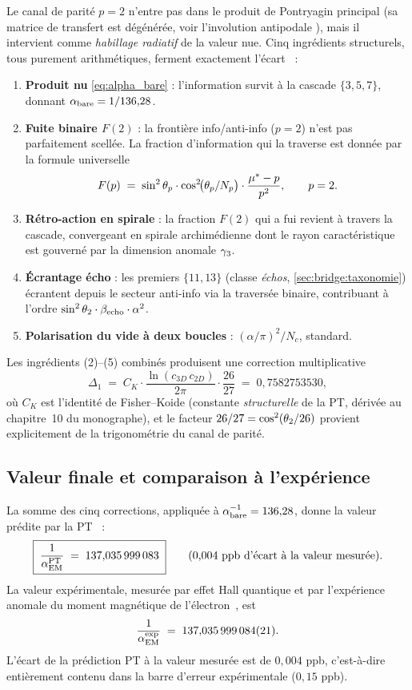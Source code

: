Le canal de parité $p = 2$ n'entre pas dans le produit de Pontryagin principal (sa matrice de transfert est dégénérée, voir l'involution antipodale \Tthree), mais il intervient comme \emph{habillage radiatif} de la valeur nue. Cinq ingrédients structurels, tous purement arithmétiques, ferment exactement l'écart~\cite[ch.~10]{PT_Monograph} :
\begin{enumerate}[nosep,leftmargin=*,label=(\arabic*)]
\item \textbf{Produit nu} \eqref{eq:alpha_bare} : l'information survit à la cascade $\{3, 5, 7\}$, donnant $\alpha_{\rm bare} = 1/136{,}28$.
\item \textbf{Fuite binaire $F(2)$} : la frontière info/anti-info ($p = 2$) n'est pas parfaitement scellée. La fraction d'information qui la traverse est donnée par la formule universelle
\[
F(p) \;=\; \sin^{2}\theta_{p} \cdot \cos^{2}\!\bigl(\theta_{p}/N_p\bigr) \cdot \dfrac{\mu^{*} - p}{p^{2}},
\qquad p = 2.
\]
\item \textbf{Rétro-action en spirale} : la fraction $F(2)$ qui a fui revient à travers la cascade, convergeant en spirale archimédienne dont le rayon caractéristique est gouverné par la dimension anomale $\gamma_{3}$.
\item \textbf{Écrantage écho} : les premiers $\{11, 13\}$ (classe \emph{échos}, \ref{sec:bridge:taxonomie}) écrantent depuis le secteur anti-info via la traversée binaire, contribuant à l'ordre $\sin^{2}\theta_{2} \cdot \beta_{\rm echo} \cdot \alpha^{2}$.
\item \textbf{Polarisation du vide à deux boucles} : $(\alpha/\pi)^{2}/N_c$, standard.
\end{enumerate}
Les ingrédients (2)--(5) combinés produisent une correction multiplicative
\[
\Delta_1 \;=\; C_K \cdot \frac{\ln(c_{3D}\,c_{2D})}{2\pi} \cdot \dfrac{26}{27}
\;=\; 0{,}7582753530,
\]
où $C_K$ est l'identité de Fisher--Koide (constante \emph{structurelle} de la PT, dérivée au chapitre~10 du monographe), et le facteur $26/27 = \cos^{2}(\theta_{2}/26)$ provient explicitement de la trigonométrie du canal de parité.

\subsection{Valeur finale et comparaison à l'expérience}
\label{sec:alphaem:resultat}

La somme des cinq corrections, appliquée à $\alpha_{\rm bare}^{-1} = 136{,}28$, donne la valeur prédite par la PT~\cite[éq.~(R32)]{PT_Monograph} :
\begin{equation}
\boxed{\;
\frac{1}{\alpha_{\rm EM}^{\rm PT}} \;=\; 137{,}035\,999\,083 \;}
\qquad
\text{(0,004 ppb d'écart à la valeur mesurée).}
\label{eq:alpha_EM_final}
\end{equation}
La valeur expérimentale, mesurée par effet Hall quantique et par l'expérience anomale du moment magnétique de l'électron~\cite{PDG2024}, est
\[
\dfrac{1}{\alpha_{\rm EM}^{\rm exp}} \;=\; 137{,}035\,999\,084(21).
\]
L'écart de la prédiction PT à la valeur mesurée est de $0{,}004$ ppb, c'est-à-dire entièrement contenu dans la barre d'erreur expérimentale ($0{,}15$ ppb).

